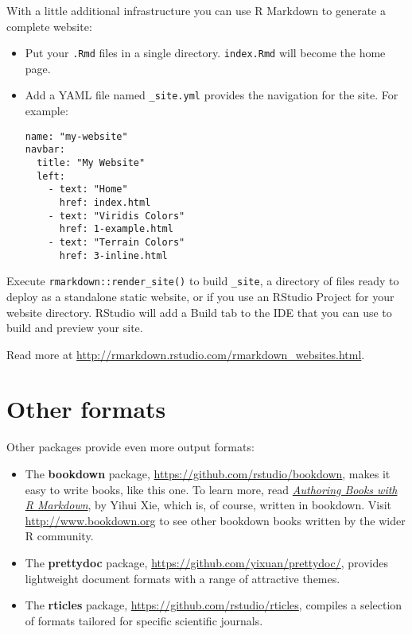 \documentclass[]{book}
\begin{document}
With a little additional infrastructure you can use R Markdown to
generate a complete website:

\begin{itemize}
\item
  Put your \texttt{.Rmd} files in a single directory. \texttt{index.Rmd}
  will become the home page.
\item
  Add a YAML file named \texttt{\_site.yml} provides the navigation for
  the site. For example:

\begin{verbatim}
name: "my-website"
navbar:
  title: "My Website"
  left:
    - text: "Home"
      href: index.html
    - text: "Viridis Colors"
      href: 1-example.html
    - text: "Terrain Colors"
      href: 3-inline.html
\end{verbatim}
\end{itemize}

Execute \texttt{rmarkdown::render\_site()} to build \texttt{\_site}, a
directory of files ready to deploy as a standalone static website, or if
you use an RStudio Project for your website directory. RStudio will add
a Build tab to the IDE that you can use to build and preview your site.

Read more at \url{http://rmarkdown.rstudio.com/rmarkdown_websites.html}.

\section{Other formats}\label{other-formats}

Other packages provide even more output formats:

\begin{itemize}
\item
  The \textbf{bookdown} package,
  \url{https://github.com/rstudio/bookdown}, makes it easy to write
  books, like this one. To learn more, read
  \href{https://bookdown.org/yihui/bookdown/}{\emph{Authoring Books with
  R Markdown}}, by Yihui Xie, which is, of course, written in bookdown.
  Visit \url{http://www.bookdown.org} to see other bookdown books
  written by the wider R community.
\item
  The \textbf{prettydoc} package,
  \url{https://github.com/yixuan/prettydoc/}, provides lightweight
  document formats with a range of attractive themes.
\item
  The \textbf{rticles} package,
  \url{https://github.com/rstudio/rticles}, compiles a selection of
  formats tailored for specific scientific journals.
\end{itemize}
\end{document}
